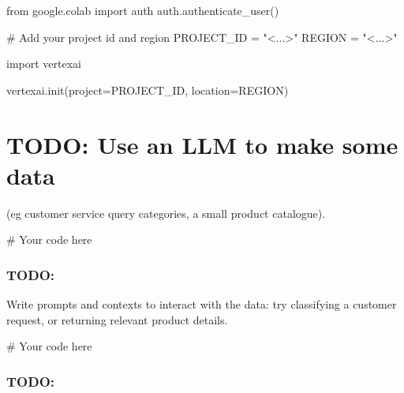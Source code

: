 \documentclass[
  letterpaper,
  DIV=11,
  numbers=noendperiod]{scrreprt}
\newenvironment{Shaded}{\begin{snugshade}}{\end{snugshade}}
\newcommand{\CommentTok}[1]{\textcolor[rgb]{0.37,0.37,0.37}{#1}}
\newcommand{\ImportTok}[1]{\textcolor[rgb]{0.00,0.46,0.62}{#1}}
\newcommand{\NormalTok}[1]{\textcolor[rgb]{0.00,0.23,0.31}{#1}}
\newcommand{\OperatorTok}[1]{\textcolor[rgb]{0.37,0.37,0.37}{#1}}
\newcommand{\StringTok}[1]{\textcolor[rgb]{0.13,0.47,0.30}{#1}}
\begin{document}
\begin{Shaded}
\begin{Highlighting}[]
\ImportTok{from}\NormalTok{ google.colab }\ImportTok{import}\NormalTok{ auth}
\NormalTok{auth.authenticate\_user()}
\end{Highlighting}
\end{Shaded}

\begin{Shaded}
\begin{Highlighting}[]
\CommentTok{\# Add your project id and region}
\NormalTok{PROJECT\_ID }\OperatorTok{=} \StringTok{"\textless{}...\textgreater{}"}
\NormalTok{REGION }\OperatorTok{=} \StringTok{"\textless{}...\textgreater{}"}

\ImportTok{import}\NormalTok{ vertexai}

\NormalTok{vertexai.init(project}\OperatorTok{=}\NormalTok{PROJECT\_ID, location}\OperatorTok{=}\NormalTok{REGION)}
\end{Highlighting}
\end{Shaded}

\hypertarget{todo-use-an-llm-to-make-some-data}{%
\chapter{TODO: Use an LLM to make some
data}\label{todo-use-an-llm-to-make-some-data}}

(eg customer service query categories, a small product catalogue).

\begin{Shaded}
\begin{Highlighting}[]
\CommentTok{\# Your code here}
\end{Highlighting}
\end{Shaded}

\hypertarget{todo}{%
\subsection{TODO:}\label{todo}}

Write prompts and contexts to interact with the data: try classifying a
customer request, or returning relevant product details.

\begin{Shaded}
\begin{Highlighting}[]
\CommentTok{\# Your code here}
\end{Highlighting}
\end{Shaded}

\hypertarget{todo-1}{%
\subsection{TODO:}\label{todo-1}}
\end{document}
